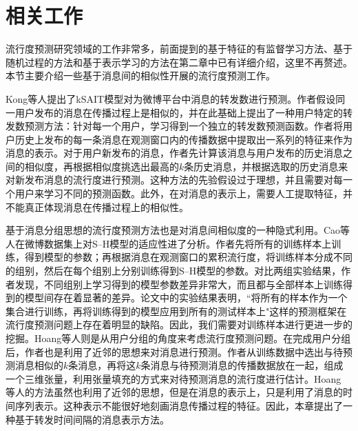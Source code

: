 \section{相关工作}
流行度预测研究领域的工作非常多，前面提到的基于特征的有监督学习方法、基于随机过程的方法和基于表示学习的方法在第二章中已有详细介绍，这里不再赘述。本节主要介绍一些基于消息间的相似性开展的流行度预测工作。

Kong等人\citep{kong2014kSAIT}提出了kSAIT模型对为微博平台中消息的转发数进行预测。作者假设同一用户发布的消息在传播过程上是相似的，并在此基础上提出了一种用户特定的转发数预测方法：针对每一个用户，学习得到一个独立的转发数预测函数。作者将用户历史上发布的每一条消息在观测窗口内的传播数据中提取出一系列的特征来作为消息的表示。对于用户新发布的消息，作者先计算该消息与用户发布的历史消息之间的相似度，再根据相似度挑选出最高的$k$条历史消息，并根据选取的历史消息来对新发布消息的流行度进行预测。这种方法的先验假设过于理想，并且需要对每一个用户来学习不同的预测函数。此外，在对消息的表示上，需要人工提取特征，并不能真正体现消息在传播过程上的相似性。

基于消息分组思想的流行度预测方法也是对消息间相似度的一种隐式利用。Cao等人\citep{cao2017predicting}在微博数据集上对S--H模型\citep{szabo2010predicting}的适应性进了分析。作者先将所有的训练样本上训练，得到模型的参数；再根据消息在观测窗口的累积流行度，将训练样本分成不同的组别，然后在每个组别上分别训练得到S--H模型的参数。对比两组实验结果，作者发现，不同组别上学习得到的模型参数差异非常大，而且都与全部样本上训练得到的模型间存在着显著的差异。论文中的实验结果表明，``将所有的样本作为一个集合进行训练，再将训练得到的模型应用到所有的测试样本上"这样的预测框架在流行度预测问题上存在着明显的缺陷。因此，我们需要对训练样本进行更进一步的挖掘。Hoang等人\citep{hoang2017gpop}则是从用户分组的角度来考虑流行度预测问题。在完成用户分组后，作者也是利用了近邻的思想来对消息进行预测。作者从训练数据中选出与待预测消息相似的$k$条消息，再将这$k$条消息与待预测消息的传播数据放在一起，组成一个三维张量，利用张量填充的方式来对待预测消息的流行度进行估计。Hoang 等人的方法虽然也利用了近邻的思想，但是在消息的表示上，只是利用了消息的时间序列表示。这种表示不能很好地刻画消息传播过程的特征。因此，本章提出了一种基于转发时间间隔的消息表示方法。


